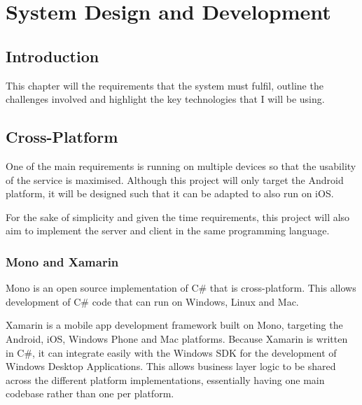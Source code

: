 
\chapter{System Design and Development} %

\label{Chapter4} %



\section{Introduction}

This chapter will the requirements that the system must fulfil, outline the challenges involved and highlight the key technologies that I will be using.



\section{Cross-Platform}

One of the main requirements is running on multiple devices so that the usability of the service is maximised. Although this project will only target the Android platform, it will be designed such that it can be adapted to also run on iOS.

For the sake of simplicity and given the time requirements, this project will also aim to implement the server and client in the same programming language.

\subsection{Mono and Xamarin}

Mono is an open source implementation of C\# that is cross-platform. This allows development of C\# code that can run on Windows, Linux and Mac.

Xamarin is a mobile app development framework built on Mono, targeting the Android, iOS, Windows Phone and Mac platforms. Because Xamarin is written in C\#, it can integrate easily with the Windows SDK for the development of Windows Desktop Applications. This allows business layer logic to be shared across the different platform implementations, essentially having one main codebase rather than one per platform.

